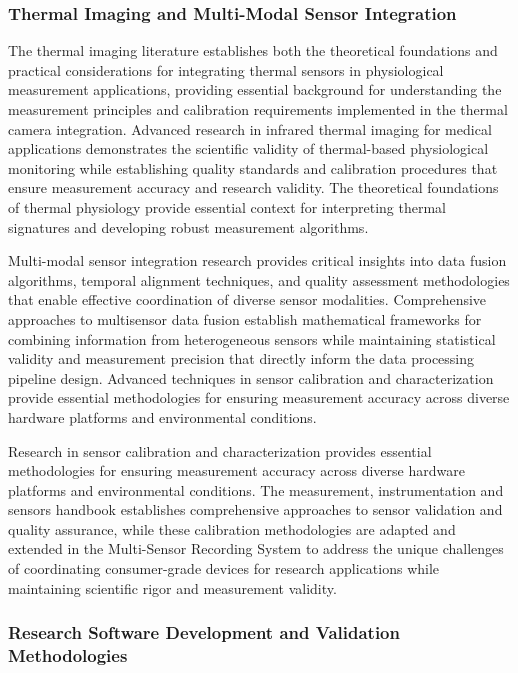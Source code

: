 \documentclass[12pt,a4paper]{report}
\begin{document}
\subsubsection{Thermal Imaging and Multi-Modal Sensor Integration}

The thermal imaging literature establishes both the theoretical foundations and practical considerations for integrating
thermal sensors in physiological measurement applications, providing essential background for understanding the
measurement principles and calibration requirements implemented in the thermal camera integration. Advanced research in
infrared thermal imaging for medical applications demonstrates the scientific validity of thermal-based physiological
monitoring while establishing quality standards and calibration procedures that ensure measurement accuracy and research
validity. The theoretical foundations of thermal physiology provide essential context for interpreting thermal
signatures and developing robust measurement algorithms.

Multi-modal sensor integration research provides critical insights into data fusion algorithms, temporal alignment
techniques, and quality assessment methodologies that enable effective coordination of diverse sensor modalities.
Comprehensive approaches to multisensor data fusion establish mathematical frameworks for combining information from
heterogeneous sensors while maintaining statistical validity and measurement precision that directly inform the data
processing pipeline design. Advanced techniques in sensor calibration and characterization provide essential
methodologies for ensuring measurement accuracy across diverse hardware platforms and environmental conditions.

Research in sensor calibration and characterization provides essential methodologies for ensuring measurement accuracy
across diverse hardware platforms and environmental conditions. The measurement, instrumentation and sensors handbook
establishes comprehensive approaches to sensor validation and quality assurance, while these calibration methodologies
are adapted and extended in the Multi-Sensor Recording System to address the unique challenges of coordinating
consumer-grade devices for research applications while maintaining scientific rigor and measurement validity.

\subsubsection{Research Software Development and Validation Methodologies}
\end{document}
